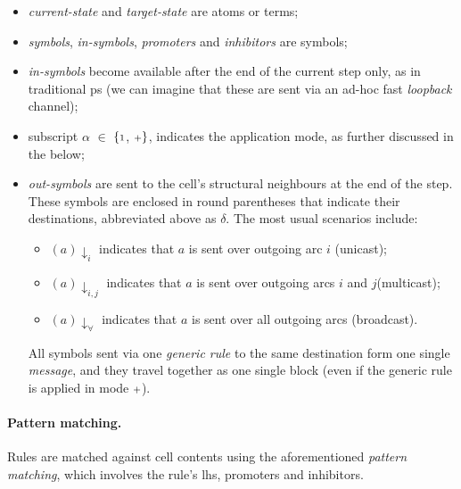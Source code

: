 \begin{itemize}
\item \emph{current-state} and \emph{target-state} are atoms or terms;

\smallskip
\item \emph{symbols}, \emph{in-symbols}, \emph{promoters} and \emph{inhibitors} are symbols;

\smallskip
\item \emph{in-symbols} become available after the end of the current step only, as in traditional \gls{ps}  (we can imagine that these are sent via an ad-hoc fast \emph{loopback} channel); 

\smallskip
\item subscript \(\alpha\) \(\in\) \(\{{\scriptstyle 1}\), \({\scriptstyle +}\}\), 
indicates the application mode, as further discussed in the below;

\smallskip
\item \emph{out-symbols} are sent to the cell's structural neighbours at the end of the step.
These symbols are enclosed in round parentheses that indicate 
their destinations, abbreviated above as \(\delta\). 
The most usual scenarios include: 

\begin{itemize}
\item \((a)\downarrow_i\) indicates that \(a\) is sent over outgoing arc \(i\) (unicast); 

\item \((a)\downarrow_{i,j}\) indicates that \(a\) is sent over outgoing arcs \(i\) and \(j\)(multicast); 

\item \((a)\downarrow_\forall\) indicates that \(a\) is sent over all outgoing arcs (broadcast). 
\end{itemize}


All symbols sent via one \emph{generic rule} to the same destination form one single \emph{message}, and they travel together as one single block (even if the generic rule is applied in mode \({\scriptstyle +}\)).
\end{itemize}

\smallskip
\noindent
\paragraph{Pattern matching.}
Rules are matched against cell contents using the aforementioned \emph{pattern matching},
which involves the rule's \gls{lhs}, promoters and inhibitors.%


